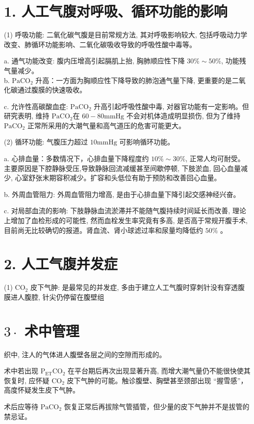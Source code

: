 \documentclass[10pt]{article}
\begin{document}
\section*{1. 人工气腹对呼吸、循环功能的影响}
(1) 呼吸功能: 二氧化碳气腹是目前常规方法, 其对呼吸影响较大, 包括呼吸动力学改变、肺循环功能影响、二氧化碳吸收导致的呼吸性酸中毒等。

a. 通气功能改变: 腹内压增高引起膈肌上抬, 胸肺顺应性下降 $30 \% \sim 50 \%$, 功能残气量减少。\\
b. $\mathrm{PaCO}_{2}$ 升高：一方面为胸顺应性下降导致的肺泡通气量下降, 更重要的是二氧化碳通过腹膜的快速吸收。

c. 允许性高碳酸血症: $\mathrm{PaCO}_{2}$ 升高引起呼吸性酸中毒, 对器官功能有一定影响。但研究表明, 维持 $\mathrm{PaCO}_{2}$在 $60-80 \mathrm{mmHg}$ 不会对机体造成明显损伤, 但为了维持 $\mathrm{PaCO}_{2}$ 正常所采用的大潮气量和高气道压的危害可能更大。

(2) 循环功能: 气腹压力超过 $10 \mathrm{mmHg}$ 可影响循环功能。

a. 心排血量：多数情况下，心排血量下降程度约 $10 \% \sim 30 \%$, 正常人均可耐受。主要原因是下腔静脉受压,导致静脉回流减缓甚至间歇停顿, 下肢淤血, 回心血量减少, 心室舒张末期容积减少。扩容和头低位有助于预防和改善回心血量。

b. 外周血管阻力: 外周血管阻力增高, 是由于心排血量下降引起交感神经兴奋。

c. 对局部血流的影响: 下肢静脉血流淤滞并不能随气腹持续时间延长而改善, 理论上增加了血检形成的可能性, 然而血栓发生率究竟有多高, 是否高于常规开腹手术, 目前尚无比较确切的报道。肾血流、肾小球滤过率和尿量均降低约 $50 \%$ 。

\section*{2. 人工气腹并发症}
(1) $\mathrm{CO}_{2}$ 皮下气肿: 是最常见的并发症, 多由于建立人工气腹时穿刺针没有穿透腹膜进人腹腔, 针尖仍停留在腹壁组

\section*{$3 \cdot$ 术中管理}
织中, 注人的气体进人腹壁各层之间的空隙而形成的。

术中若出现 $\mathrm{P}_{\mathrm{ET}} \mathrm{CO}_{2}$ 在平台期后再次出现显著升高, 而增大潮气量仍不能很快使其恢复时, 应怀疑 $\mathrm{CO}_{2}$ 皮下气肿的可能。触诊腹壁、胸壁甚至颈部出现 “握雪感”，高度怀疑发生皮下气肿。

术后应等待 $\mathrm{PaCO}_{2}$ 恢复正常后再拔除气管插管，但少量的皮下气肿并不是拔管的禁忌证。
\end{document}
